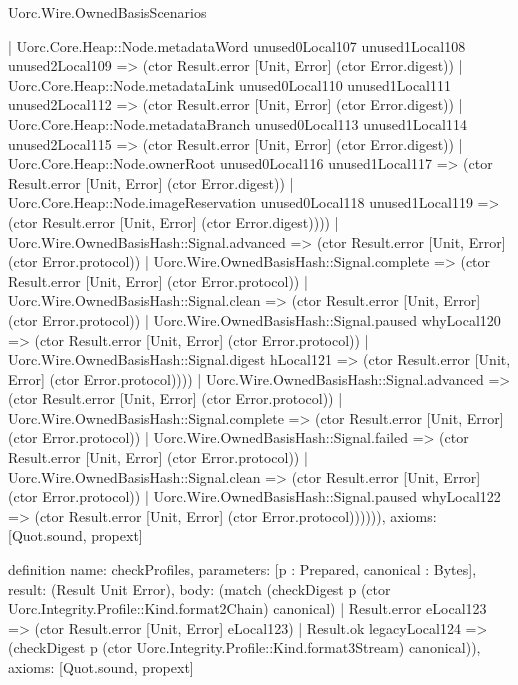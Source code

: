 \begin{lexlean}{Uorc.Wire.OwnedBasisScenarios}
\begin{semanticmodule}
{              | Uorc.Core.Heap::Node.metadataWord unused0Local107 unused1Local108 unused2Local109 => (ctor Result.error [Unit, Error] (ctor Error.digest))
              | Uorc.Core.Heap::Node.metadataLink unused0Local110 unused1Local111 unused2Local112 => (ctor Result.error [Unit, Error] (ctor Error.digest))
              | Uorc.Core.Heap::Node.metadataBranch unused0Local113 unused1Local114 unused2Local115 => (ctor Result.error [Unit, Error] (ctor Error.digest))
              | Uorc.Core.Heap::Node.ownerRoot unused0Local116 unused1Local117 => (ctor Result.error [Unit, Error] (ctor Error.digest))
              | Uorc.Core.Heap::Node.imageReservation unused0Local118 unused1Local119 => (ctor Result.error [Unit, Error] (ctor Error.digest))))
          | Uorc.Wire.OwnedBasisHash::Signal.advanced => (ctor Result.error [Unit, Error] (ctor Error.protocol))
          | Uorc.Wire.OwnedBasisHash::Signal.complete => (ctor Result.error [Unit, Error] (ctor Error.protocol))
          | Uorc.Wire.OwnedBasisHash::Signal.clean => (ctor Result.error [Unit, Error] (ctor Error.protocol))
          | Uorc.Wire.OwnedBasisHash::Signal.paused whyLocal120 => (ctor Result.error [Unit, Error] (ctor Error.protocol))
          | Uorc.Wire.OwnedBasisHash::Signal.digest hLocal121 => (ctor Result.error [Unit, Error] (ctor Error.protocol))))
        | Uorc.Wire.OwnedBasisHash::Signal.advanced => (ctor Result.error [Unit, Error] (ctor Error.protocol))
        | Uorc.Wire.OwnedBasisHash::Signal.complete => (ctor Result.error [Unit, Error] (ctor Error.protocol))
        | Uorc.Wire.OwnedBasisHash::Signal.failed => (ctor Result.error [Unit, Error] (ctor Error.protocol))
        | Uorc.Wire.OwnedBasisHash::Signal.clean => (ctor Result.error [Unit, Error] (ctor Error.protocol))
        | Uorc.Wire.OwnedBasisHash::Signal.paused whyLocal122 => (ctor Result.error [Unit, Error] (ctor Error.protocol)))))),
  axioms: [Quot.sound, propext]
}

definition{
  name: checkProfiles,
  parameters: [p : Prepared, canonical : Bytes],
  result: (Result Unit Error),
  body: (match (checkDigest p (ctor Uorc.Integrity.Profile::Kind.format2Chain) canonical)
    | Result.error eLocal123 => (ctor Result.error [Unit, Error] eLocal123)
    | Result.ok legacyLocal124 => (checkDigest p (ctor Uorc.Integrity.Profile::Kind.format3Stream) canonical)),
  axioms: [Quot.sound, propext]
}


\end{semanticmodule}
\end{lexlean}

